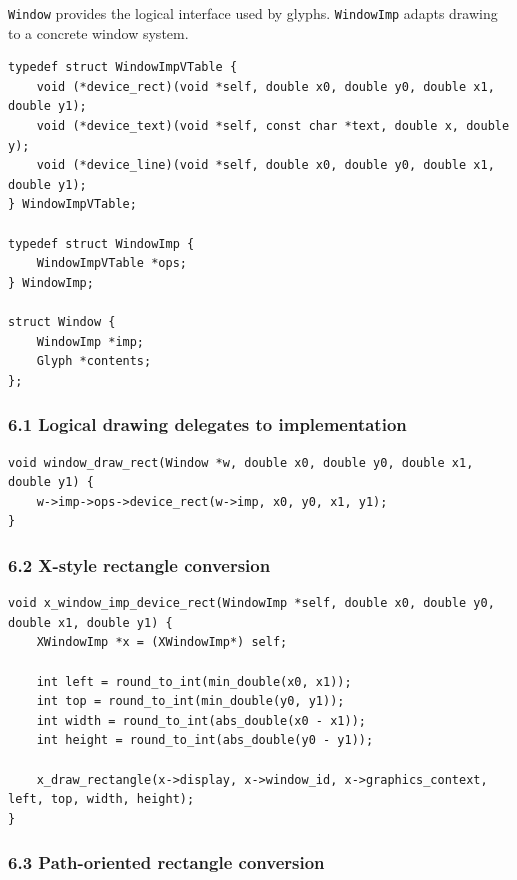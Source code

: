 \documentclass[11pt]{article}
\begin{document}
\texttt{Window} provides the logical interface used by glyphs. \texttt{WindowImp} adapts drawing to a concrete window system.

\begin{verbatim}
typedef struct WindowImpVTable {
    void (*device_rect)(void *self, double x0, double y0, double x1, double y1);
    void (*device_text)(void *self, const char *text, double x, double y);
    void (*device_line)(void *self, double x0, double y0, double x1, double y1);
} WindowImpVTable;

typedef struct WindowImp {
    WindowImpVTable *ops;
} WindowImp;

struct Window {
    WindowImp *imp;
    Glyph *contents;
};
\end{verbatim}

\subsubsection{6.1 Logical drawing delegates to implementation}\label{logical-drawing-delegates-to-implementation}

\begin{verbatim}
void window_draw_rect(Window *w, double x0, double y0, double x1, double y1) {
    w->imp->ops->device_rect(w->imp, x0, y0, x1, y1);
}
\end{verbatim}

\subsubsection{6.2 X-style rectangle conversion}\label{x-style-rectangle-conversion}

\begin{verbatim}
void x_window_imp_device_rect(WindowImp *self, double x0, double y0, double x1, double y1) {
    XWindowImp *x = (XWindowImp*) self;

    int left = round_to_int(min_double(x0, x1));
    int top = round_to_int(min_double(y0, y1));
    int width = round_to_int(abs_double(x0 - x1));
    int height = round_to_int(abs_double(y0 - y1));

    x_draw_rectangle(x->display, x->window_id, x->graphics_context, left, top, width, height);
}
\end{verbatim}

\subsubsection{6.3 Path-oriented rectangle conversion}\label{path-oriented-rectangle-conversion}
\end{document}
